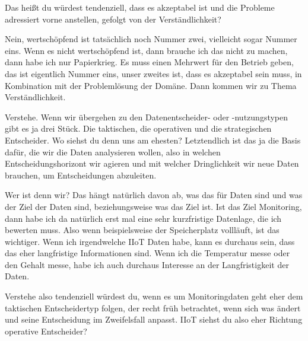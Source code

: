 \LF	 Das heißt du würdest tendenziell, dass es akzeptabel ist und die Probleme adressiert vorne anstellen, gefolgt von der Verständlichkeit?

\PA	 Nein, wertschöpfend ist tatsächlich noch Nummer zwei, vielleicht sogar Nummer eins. Wenn es nicht wertschöpfend ist, dann brauche ich das nicht zu machen, dann habe ich nur Papierkrieg. Es muss einen Mehrwert für den Betrieb geben, das ist eigentlich Nummer eins, unser zweites ist, dass es akzeptabel sein muss, in Kombination mit der Problemlösung der Domäne. Dann kommen wir zu Thema Verständlichkeit.

\LF	 Verstehe. Wenn wir übergehen zu den Datenentscheider- oder -nutzungstypen gibt es ja drei Stück.  Die taktischen, die operativen und die strategischen Entscheider. Wo siehst du denn uns am ehesten? Letztendlich ist das ja die Basis dafür, die wir die Daten analysieren wollen, also in welchen Entscheidungshorizont wir agieren und mit welcher Dringlichkeit wir neue Daten brauchen, um Entscheidungen abzuleiten.

\PA	 Wer ist denn wir? Das hängt natürlich davon ab, was das für Daten sind und was der Ziel der Daten sind, beziehungsweise was das Ziel ist. Ist das Ziel Monitoring, dann habe ich da natürlich erst mal eine sehr kurzfristige Datenlage, die ich bewerten muss. Also wenn beispielsweise der Speicherplatz vollläuft, ist das wichtiger. Wenn ich irgendwelche \ac{IIoT} Daten habe, kann es durchaus sein, dass das eher langfristige Informationen sind. Wenn ich die Temperatur messe oder den \coo{} Gehalt messe, habe ich auch durchaus Interesse an der Langfristigkeit der Daten.

\LF	 Verstehe also tendenziell würdest du, wenn es um Monitoringdaten geht eher dem taktischen Entscheidertyp folgen, der recht früh betrachtet, wenn sich was ändert und seine Entscheidung im Zweifelsfall anpasst. \ac{IIoT} siehst du also eher Richtung operative Entscheider?

